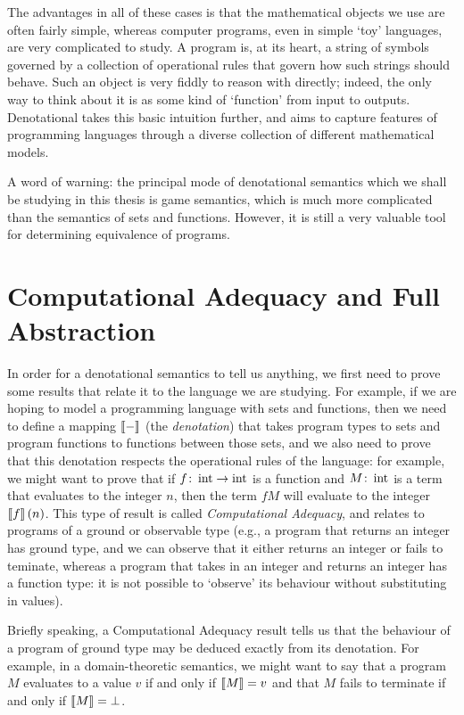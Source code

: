 \documentclass[11pt]{report}
\begin{document}
The advantages in all of these cases is that the mathematical objects we use are often fairly simple, whereas computer programs, even in simple `toy' languages, are very complicated to study. 
A program is, at its heart, a string of symbols governed by a collection of operational rules that govern how such strings should behave. 
Such an object is very fiddly to reason with directly; indeed, the only way to think about it is as some kind of `function' from input to outputs.
Denotational takes this basic intuition further, and aims to capture features of programming languages through a diverse collection of different mathematical models.

A word of warning: the principal mode of denotational semantics which we shall be studying in this thesis is game semantics, which is much more complicated than the semantics of sets and functions. 
However, it is still a very valuable tool for determining equivalence of programs.

\section{Computational Adequacy and Full Abstraction}
\label{SecCAnFA}

In order for a denotational semantics to tell us anything, we first need to prove some results that relate it to the language we are studying. 
For example, if we are hoping to model a programming language with sets and functions, then we need to define a mapping $\left\llbracket-\right\rrbracket$ (the \emph{denotation}) that takes program types to sets and program functions to functions between those sets, and we also need to prove that this denotation respects the operational rules of the language: for example, we might want to prove that if $f \colon \operatorname{int} \to \operatorname{int}$ is a function and $M \colon \operatorname{int}$ is a term that evaluates to the integer $n$, then the term $f M$ will evaluate to the integer $\left\llbracket f\right\rrbracket(n)$.
This type of result is called \emph{Computational Adequacy}, and relates to programs of a ground or observable type (e.g., a program that returns an integer has ground type, and we can observe that it either returns an integer or fails to teminate, whereas a program that takes in an integer and returns an integer has a function type: it is not possible to `observe' its behaviour without substituting in values).

Briefly speaking, a Computational Adequacy result tells us that the behaviour of a program of ground type may be deduced exactly from its denotation.
For example, in a domain-theoretic semantics, we might want to say that a program $M$ evaluates to a value $v$ if and only if $\left\llbracket M\right\rrbracket=v$ and that $M$ fails to terminate if and only if $\left\llbracket M\right\rrbracket = \bot$.
\end{document}
